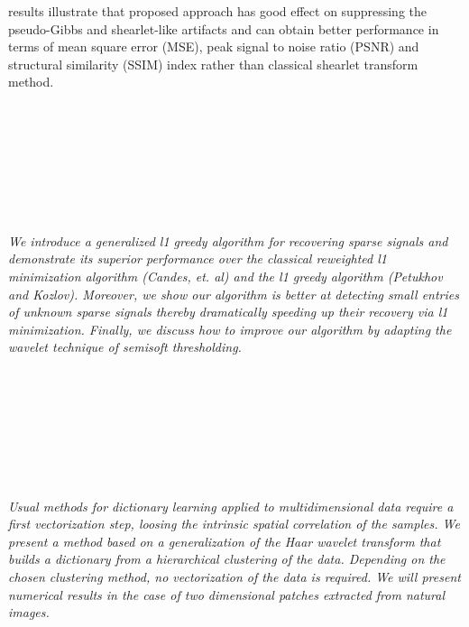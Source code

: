 \begin{multicols}{2}
{results illustrate that proposed approach has good effect on suppressing the pseudo-Gibbs and shearlet-like artifacts and can obtain better performance in terms of mean square  error  (MSE),  peak  signal  to noise  ratio  (PSNR)  and  structural  similarity 
(SSIM) index rather than classical shearlet transform method.}\\
\\ 
      \\
      \\\\
      \\
      \\\\
\\
    \textit{We introduce a generalized l1 greedy algorithm for recovering sparse signals and demonstrate its superior performance over the classical reweighted l1 minimization algorithm (Candes, et. al) and the l1 greedy algorithm (Petukhov and Kozlov). Moreover, we show our algorithm is better at detecting small entries of unknown sparse signals thereby dramatically speeding up their recovery via l1 minimization. Finally, we discuss how to improve our algorithm by adapting the wavelet technique of semisoft thresholding.}\\
\\ 
      \\
      \\\\
      \\
      \\\\
\\
    \textit{Usual methods for dictionary learning applied to multidimensional data require a first vectorization step, loosing the intrinsic spatial correlation of the samples. We present a method based on a generalization of the Haar wavelet transform that builds a dictionary from a hierarchical clustering of the data. Depending on the chosen clustering method, no vectorization of the data is required. We will present numerical results in the case of two dimensional patches extracted from natural images.}\\
\\ 
      \\
      \\\\

\end{multicols}
